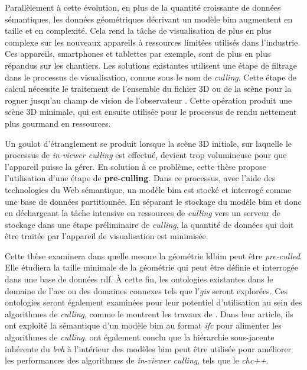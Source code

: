 \begin{refsection}
\begin{multicols}{2}
        Parallèlement à cette évolution, en plus de la  quantité croissante de données sémantiques, les données géométriques décrivant un modèle \ac{bim} augmentent en taille et en complexité. Cela rend la tâche de visualisation de plus en plus complexe sur les nouveaux appareils à ressources limitées utilisés dans l'industrie. Ces appareils, smartphones et tablettes par exemple, sont de plus en plus répandus sur les chantiers. Les solutions existantes utilisent une étape de filtrage dans le processus de visualisation, connue sous le nom de \emph{culling}. Cette étape de calcul nécessite le traitement de l'ensemble du fichier 3D ou de la scène pour la rogner jusqu'au champ de vision de l'observateur \parencite{Johansson2015}. Cette opération produit une scène 3D minimale, qui est ensuite utilisée pour le processus de rendu nettement plus gourmand en ressources.

        Un goulot d'étranglement se produit lorsque la scène 3D initiale, sur laquelle le processus de \emph{in-viewer culling} est effectué, devient trop volumineuse pour que l'appareil puisse la gérer. En solution à ce problème, cette thèse propose l'utilisation d'une étape de \textbf{pre-culling}. Dans ce processus, avec l'aide des technologies du Web sémantique, un modèle \ac{bim} est stocké et interrogé comme une base de données partitionnée. En séparant le stockage du modèle \ac{bim} et donc en déchargeant la tâche intensive en ressources de \emph{culling} vers un serveur de stockage dans une étape préliminaire de \emph{culling}, la quantité de données qui doit être traitée par l'appareil de visualisation est minimisée.

        Cette thèse examinera dans quelle mesure la géométrie \ac{ldbim} peut être \emph{pre-culled}. Elle étudiera la taille minimale de la géométrie qui peut être définie et interrogée dans une base de données \ac{rdf}. À cette fin, les ontologies existantes dans le domaine de l'\ac{aec} ou des domaines connexes tels que l'\emph{\ac{gis}} seront explorées. Ces ontologies seront également examinées pour leur potentiel d'utilisation au sein des algorithmes de \emph{culling}, comme le montrent les travaux de \cite{Johansson2009}. Dans leur article, ils ont exploité la sémantique d'un modèle \ac{bim} au format \emph{\ac{ifc}} pour alimenter les algorithmes de \emph{culling}. \cite{Johansson2015} ont également conclu que la hiérarchie sous-jacente inhérente du \emph{\ac{bvh}} à l'intérieur des modèles \ac{bim} peut être utilisée pour améliorer les performances des algorithmes de \emph{in-viewer culling}, tels que le \emph{\ac{chc}++}.


\end{multicols}
\end{refsection}
